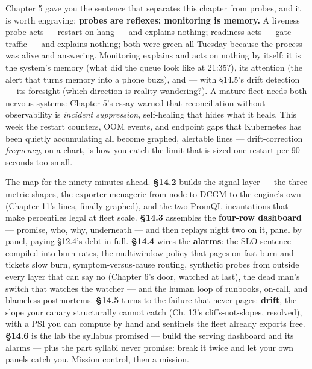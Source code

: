 Chapter 5 gave you the sentence that separates this chapter from probes, and it is worth engraving: \textbf{probes are reflexes; monitoring is memory.} A liveness probe acts — restart on hang — and explains nothing; readiness acts — gate traffic — and explains nothing; both were green all Tuesday because the process was alive and answering. Monitoring explains and acts on nothing by itself: it is the system’s memory (what did the queue look like at 21:35?), its attention (the alert that turns memory into a phone buzz), and — with §14.5’s drift detection — its foresight (which direction is reality wandering?). A mature fleet needs both nervous systems: Chapter 5’s essay warned that reconciliation without observability is \textit{incident suppression}, self-healing that hides what it heals. This week the restart counters, OOM events, and endpoint gaps that Kubernetes has been quietly accumulating all become graphed, alertable lines — drift-correction \textit{frequency}, on a chart, is how you catch the limit that is sized one restart-per-90-seconds too small.

The map for the ninety minutes ahead. \textbf{§14.2} builds the signal layer — the three metric shapes, the exporter menagerie from node to DCGM to the engine’s own  (Chapter 11’s lines, finally graphed), and the two PromQL incantations that make percentiles legal at fleet scale. \textbf{§14.3} assembles the \textbf{four-row dashboard} — promise, who, why, underneath — and then replays night two on it, panel by panel, paying §12.4’s debt in full. \textbf{§14.4} wires the \textbf{alarms}: the SLO sentence compiled into burn rates, the multiwindow policy that pages on fast burn and tickets slow burn, symptom-versus-cause routing, synthetic probes from outside every layer that can say no (Chapter 6’s door, watched at last), the dead man’s switch that watches the watcher — and the human loop of runbooks, on-call, and blameless postmortems. \textbf{§14.5} turns to the failure that never pages: \textbf{drift}, the slope your canary structurally cannot catch (Ch. 13’s cliffs-not-slopes, resolved), with a PSI you can compute by hand and sentinels the fleet already exports free. \textbf{§14.6} is the lab the syllabus promised — build the serving dashboard and its alarms — plus the part syllabi never promise: break it twice and let your own panels catch you. Mission control, then a mission.

